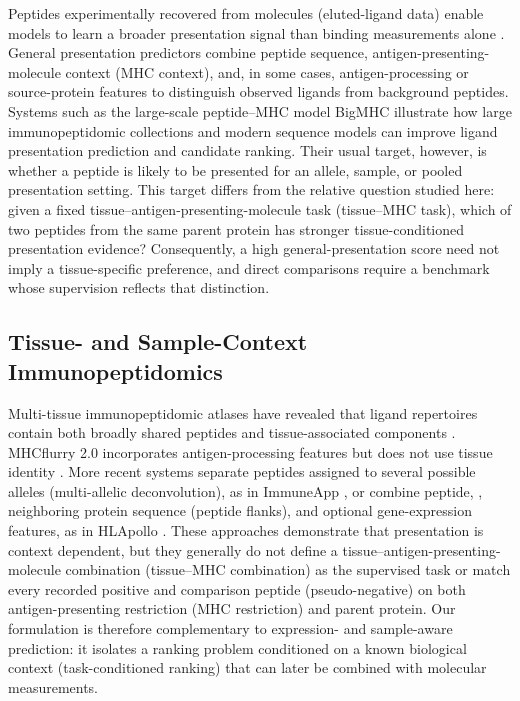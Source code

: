 Peptides experimentally recovered from \plainMHC{} molecules (eluted-ligand data) enable models to learn a broader presentation signal than binding measurements alone \cite{reynisson2020netmhcpan,odonnell2020mhcflurry}. General presentation predictors combine peptide sequence, antigen-presenting-molecule context (MHC context), and, in some cases, antigen-processing or source-protein features to distinguish observed ligands from background peptides. Systems such as the large-scale peptide--MHC model BigMHC \cite{albert2023bigmhc} illustrate how large immunopeptidomic collections and modern sequence models can improve ligand presentation prediction and candidate ranking. Their usual target, however, is whether a peptide is likely to be presented for an allele, sample, or pooled presentation setting. This target differs from the relative question studied here: given a fixed tissue--antigen-presenting-molecule task (tissue--MHC task), which of two peptides from the same parent protein has stronger tissue-conditioned presentation evidence? Consequently, a high general-presentation score need not imply a tissue-specific preference, and direct comparisons require a benchmark whose supervision reflects that distinction.

\subsection{Tissue- and Sample-Context Immunopeptidomics}

Multi-tissue immunopeptidomic atlases have revealed that ligand repertoires contain both broadly shared peptides and tissue-associated components \cite{marcu2021atlas,schuster2018mouse}. MHCflurry 2.0 incorporates antigen-processing features but does not use tissue identity \cite{odonnell2020mhcflurry}. More recent systems separate peptides assigned to several possible alleles (multi-allelic deconvolution), as in ImmuneApp \cite{xu2024immuneapp}, or combine peptide, \plainMHC{}, neighboring protein sequence (peptide flanks), and optional gene-expression features, as in HLApollo \cite{thrift2024hlapollo}. These approaches demonstrate that presentation is context dependent, but they generally do not define a tissue--antigen-presenting-molecule combination (tissue--MHC combination) as the supervised task or match every recorded positive and comparison peptide (pseudo-negative) on both antigen-presenting restriction (MHC restriction) and parent protein. Our formulation is therefore complementary to expression- and sample-aware prediction: it isolates a ranking problem conditioned on a known biological context (task-conditioned ranking) that can later be combined with molecular measurements.

